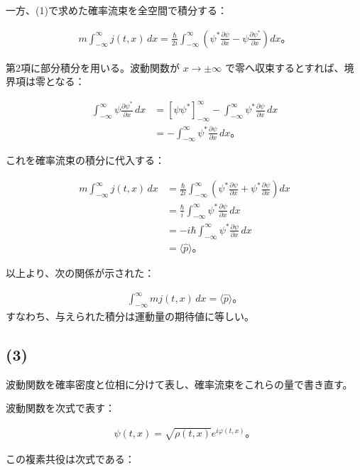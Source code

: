 \documentclass[platex,dvipdfmx,a4paper]{jsarticle}
\newcommand{\hb}[2]{\frac{\partial #1}{\partial #2}}
\begin{document}
一方、(1)で求めた確率流束を全空間で積分する：

\begin{align*}
  m\int_{-\infty}^{\infty}j(t,x)\,dx
  =\frac{\hbar}{2i}
  \int_{-\infty}^{\infty}
  \left(
    \psi^*\hb{\psi}{x}
    -\psi\hb{\psi^*}{x}
  \right)dx。
\end{align*}

第2項に部分積分を用いる。波動関数が $x\to\pm\infty$ で零へ収束するとすれば、境界項は零となる：

\begin{align*}
  \int_{-\infty}^{\infty}
  \psi\hb{\psi^*}{x}\,dx
  &=\left[
    \psi\psi^*
  \right]_{-\infty}^{\infty}
  -\int_{-\infty}^{\infty}
  \psi^*\hb{\psi}{x}\,dx \\
  &=-\int_{-\infty}^{\infty}
  \psi^*\hb{\psi}{x}\,dx。
\end{align*}

これを確率流束の積分に代入する：

\begin{align*}
  m\int_{-\infty}^{\infty}j(t,x)\,dx
  &=\frac{\hbar}{2i}
  \int_{-\infty}^{\infty}
  \left(
    \psi^*\hb{\psi}{x}
    +\psi^*\hb{\psi}{x}
  \right)dx \\
  &=\frac{\hbar}{i}
  \int_{-\infty}^{\infty}
  \psi^*\hb{\psi}{x}\,dx \\
  &=-i\hbar
  \int_{-\infty}^{\infty}
  \psi^*\hb{\psi}{x}\,dx \\
  &=\langle\hat{p}\rangle。
\end{align*}

以上より、次の関係が示された：

\begin{align*}
  \int_{-\infty}^{\infty}
  m j(t,x)\,dx
  =\langle\hat{p}\rangle。
\end{align*}
すなわち、与えられた積分は運動量の期待値に等しい。

\subsection*{(3)}

波動関数を確率密度と位相に分けて表し、確率流束をこれらの量で書き直す。

波動関数を次式で表す：

\begin{align*}
  \psi(t,x)
  =\sqrt{\rho(t,x)}e^{i\varphi(t,x)}。
\end{align*}

この複素共役は次式である：
\end{document}
